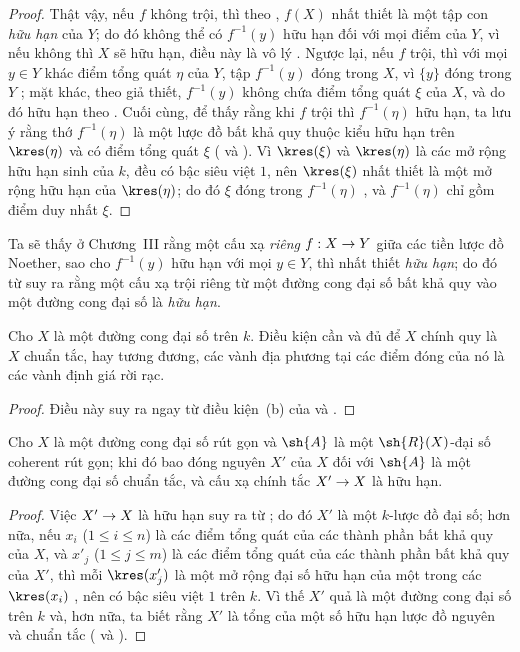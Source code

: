 \documentclass[oneside,10pt]{amsart}
\makeatletter
\renewcommand{\leq}{\leqslant}
\newcommand{\ega@arrow}[2]{\mathchoice{#1}{#2}{#2}{#2}}
\renewcommand{\to}{\ega@arrow{\longrightarrow}{\rightarrow}}
\let\EGAOriginalLabel\label
\renewcommand{\label}[1]{\phantomsection\EGAOriginalLabel{#1}}
\makeatother
\begin{document}
\begin{proof}
Thật vậy, nếu $f$ không trội, thì theo , $f(X)$ nhất thiết là một tập con \emph{hữu hạn} của $Y$; do đó không thể có $f^{-1}(y)$ hữu hạn đối với mọi điểm của $Y$, vì nếu không thì $X$ sẽ hữu hạn, điều này là vô lý .
Ngược lại, nếu $f$ trội, thì với mọi $y\in Y$ khác điểm tổng quát $\eta$ của $Y$, tập $f^{-1}(y)$ đóng trong $X$, vì $\{y\}$ đóng trong $Y$ ;
mặt khác, theo giả thiết, $f^{-1}(y)$ không chứa điểm tổng quát $\xi$ của $X$, và do đó hữu hạn theo .
Cuối cùng, để thấy rằng khi $f$ trội thì $f^{-1}(\eta)$ hữu hạn, ta lưu ý rằng thớ $f^{-1}(\eta)$ là một lược đồ bất khả quy thuộc kiểu hữu hạn trên $\kres(\eta)$ và có điểm tổng quát $\xi$ ( và ).
Vì $\kres(\xi)$ và $\kres(\eta)$ là các mở rộng hữu hạn sinh của $k$, đều có bậc siêu việt $1$, nên $\kres(\xi)$ nhất thiết là một mở rộng hữu hạn của $\kres(\eta)$; do đó $\xi$ đóng trong $f^{-1}(\eta)$ , và $f^{-1}(\eta)$ chỉ gồm điểm duy nhất $\xi$.
\end{proof}

Ta sẽ thấy ở Chương~III rằng một cấu xạ \emph{riêng} $f:X\to Y$ giữa các tiền lược đồ Noether, sao cho $f^{-1}(y)$ hữu hạn với mọi $y\in Y$, thì nhất thiết \emph{hữu hạn};
do đó từ  suy ra rằng một cấu xạ trội riêng từ một đường cong đại số bất khả quy vào một đường cong đại số là \emph{hữu hạn}.

\begin{corollary}[7.4.5]
\label{II.7.4.5}
Cho $X$ là một đường cong đại số trên $k$.
Điều kiện cần và đủ để $X$ chính quy là $X$ chuẩn tắc, hay tương đương, các vành địa phương tại các điểm đóng của nó là các vành định giá rời rạc.
\end{corollary}

\begin{proof}
Điều này suy ra ngay từ điều kiện~(b) của  và .
\end{proof}

\begin{corollary}[7.4.6]
\label{II.7.4.6}
Cho $X$ là một đường cong đại số rút gọn và $\sh{A}$ là một $\sh{R}(X)$-đại số coherent rút gọn;
khi đó bao đóng nguyên $X'$ của $X$ đối với $\sh{A}$  là một đường cong đại số chuẩn tắc, và cấu xạ chính tắc $X'\to X$ là hữu hạn.
\end{corollary}

\begin{proof}
Việc $X'\to X$ là hữu hạn suy ra từ ;
do đó $X'$ là một $k$-lược đồ đại số;
hơn nữa, nếu $x_i$ ($1\leq i\leq n$) là các điểm tổng quát của các thành phần bất khả quy của $X$, và $x'_j$ ($1\leq j\leq m$) là các điểm tổng quát của các thành phần bất khả quy của $X'$, thì mỗi $\kres(x'_j)$ là một mở rộng đại số hữu hạn của một trong các $\kres(x_i)$ , nên có bậc siêu việt $1$ trên $k$.
Vì thế $X'$ quả là một đường cong đại số trên $k$ và, hơn nữa, ta biết rằng $X'$ là tổng của một số hữu hạn lược đồ nguyên và chuẩn tắc ( và ).
\end{proof}
\end{document}
